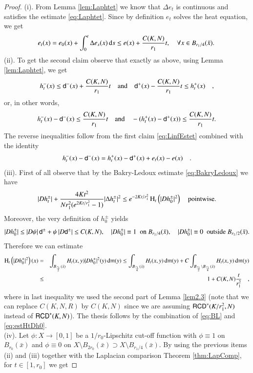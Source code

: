 \documentclass[11pt,reqno]{amsart}
\newcommand{\mm}{\mathfrak m}
\newcommand{\sfd}{{\sf d}}
\renewcommand{\H}{{\rm H}}
\renewcommand{\d}{{\rm{d}}}
\newcommand{\RCD}{{\sf RCD}}
\theoremstyle{definition}
\theoremstyle{remark}
\theoremstyle{remark}
\theoremstyle{remark}
\theoremstyle{remark}
\theoremstyle{remark}
\theoremstyle{remark}
\theoremstyle{remark}
\begin{document}
\begin{proof}
(i). From Lemma \ref{lem:Laphtet} we know that $\Delta e_t$ is continuous and satisfies the estimate \eqref{eq:Laphtet}. Since by definition $e_t$ solves the heat equation, we get
$$e_t(x)=e_0(x)+\int_0^t \Delta e_s(x) \, \d s \leq e(x) + \frac{C(K,N)}{r_{1}} t,   \quad \forall x \in B_{r_{1}/4}(\bar{x}).\, $$
(ii). To get the second claim observe that exactly as above, using Lemma \ref{lem:Laphtet}, we get  
$$h^-_{t}(x)\leq \sfd^-(x) +  \frac{C(K,N)}{r_1} t  \quad \text{and} \quad \sfd^+(x) -  \frac{C(K,N)}{r_1} t  \leq  h^+_{t}(x) \quad,   $$
or,  in other words,
$$h^-_{t}(x)- \sfd^-(x)\leq  \frac{C(K,N)}{r_1} t    \quad \text{and} \quad   -(h^+_{t}(x)-\sfd^+(x)) \leq  \frac{C(K,N)}{r_1} t. $$
The reverse inequalities follow from the first claim \eqref{eq:LinfEstet} combined with the identity
$$h^-_{t}(x)- \sfd^-(x)= h^+_{t}(x)- \sfd^+(x)+e_{t}(x)- e(x)\quad.$$
(iii). 
First of all observe that by the Bakry-Ledoux estimate \eqref{eq:BakryLedoux} we have  
\begin{equation}\label{eq:BL}
|D h^{\pm}_t|+\frac{4Kt^2}{N  r_{1}^{2} (e^{2Kt/r_{1}^{2}}-1)} |\Delta h^{\pm}_t |^2 \leq e^{-2Kt/r_{1}^{2}} \, \H_t\left( |D h^{\pm}_0|^2\right)  \quad \text{pointwise.}
\end{equation}
Moreover, the very definition of $h_0^\pm$ yields 
$$|D h_0^{\pm}| \leq |D\psi| \, \sfd^{\pm}+ \psi \, |D \sfd^{\pm}| \leq C(K,N), \quad |Dh_0^{\pm}|\equiv 1 \;\text{ on } B_{r_{1}/4}(\bar{x}), \quad  |Dh_0^{\pm}| \equiv 0 \;\text{ outside } B_{r_{1}/2}(\bar{x}).$$
Therefore we can estimate
\begin{eqnarray}
\H_t\left( |D h^{\pm}_0|^2\right)(x)&=& \int_{B_{\frac{r_{1}}{2}}(\bar{x})} H_t(x,y) |D h_0^{\pm}|^2(y) \, \d \mm(y) \leq \int_{B_{\frac{r_{1}}{4}}(\bar{x})} H_t(x,y) \, \d \mm(y) + C  \int_{B_{\frac{r_{1}}{2}}\setminus B_{\frac{r_{1}}{4}}(\bar{x})} H_t(x,y) \, \d \mm(y) \nonumber \\
& \leq& 1+ C(K,N) \frac{ t}{r_{1}^{2}} \quad, \label{eq:estHtDh0}
\end{eqnarray}
where in last inequality  we  used the second part of  Lemma \ref{lem2.3} (note that we can replace $C(K,N,R)$ by $C(K,N)$ since we are assuming $\RCD^{*}(K/r_{1}^{2},N)$ instead of $\RCD^{*}(K,N)$).  The thesis follows by  the combination of   \eqref{eq:BL} and \eqref{eq:estHtDh0}. 
\\(iv).  Let $\phi:X\to [0,1]$ be a $1/r_{0}$-Lipschitz cut-off function with $\phi\equiv 1$ on  $B_{r_{0}}(\bar{x})$ and $\phi\equiv 0$ on  $X\setminus B_{2r_{0}}(\bar{x})\supset X\setminus B_{r_{1}/4}(\bar{x})$. By using the previous items (ii) and (iii) together with the Laplacian comparison Theorem  \ref{thm:LapComp}, for $t\in [1,r_{0}]$ we get

\end{proof}
\end{document}

